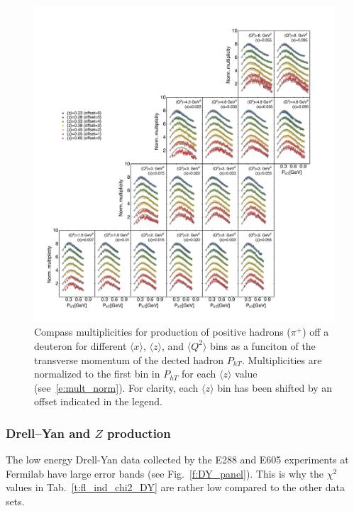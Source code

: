 \documentclass[aps,preprintnumbers,showpacs,nofootinbib,superscriptaddress,floatfix]{revtex4}
\newcommand{\AS}[1]{{\textcolor[rgb]{1,0,1}{#1}}}
\begin{document}
\begin{figure}[h!]
\begin{center}
\includegraphics[width=\textwidth]{plots/COMPASS_SCIplot_flINDEP_Piplus.pdf}
\end{center}
\caption{Compass multiplicities for production of positive hadrons ($\pi^+$) off a deuteron for different $\langle x \rangle$, $\langle z \rangle$, and $\langle Q^2 \rangle$ bins as a funciton of the transverse momentum of the dected hadron $P_{hT}$. Multiplicities are normalized to the first bin in  $P_{hT}$ for each $\langle z \rangle$ value (see~\eqref{e:mult_norm}). For clarity, each $\langle z \rangle$  bin has been shifted by an offset indicated in the legend.} 
\label{f:C_pip}
\end{figure}





\subsubsection*{\AS{Drell--Yan and $Z$ production}}
\label{sss:DYZ_agreement}


The low energy Drell-Yan data collected by the E288 and E605 experiments at Fermilab have large error bands (see Fig.~\ref{f:DY_panel}). This is why the $\chi^2$ values in Tab.~\ref{t:fl_ind_chi2_DY} are rather low compared to the other data sets. 
\end{document}
